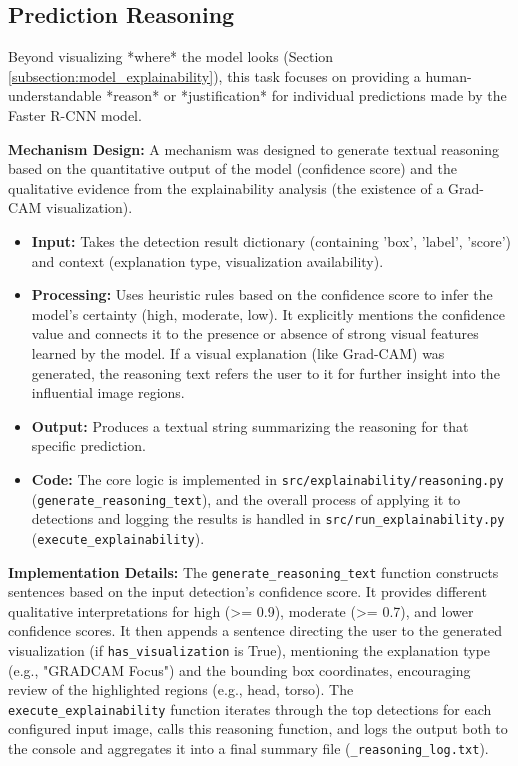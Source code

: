 \subsection{Prediction Reasoning}
\label{subsection:prediction_reasoning}
Beyond visualizing *where* the model looks (Section \ref{subsection:model_explainability}), this task focuses on providing a human-understandable *reason* or *justification* for individual predictions made by the Faster R-CNN model.

\textbf{Mechanism Design:}
A mechanism was designed to generate textual reasoning based on the quantitative output of the model (confidence score) and the qualitative evidence from the explainability analysis (the existence of a Grad-CAM visualization).
\begin{itemize}
    \item   \textbf{Input:} Takes the detection result dictionary (containing 'box', 'label', 'score') and context (explanation type, visualization availability).
    \item   \textbf{Processing:} Uses heuristic rules based on the confidence score to infer the model's certainty (high, moderate, low). It explicitly mentions the confidence value and connects it to the presence or absence of strong visual features learned by the model. If a visual explanation (like Grad-CAM) was generated, the reasoning text refers the user to it for further insight into the influential image regions.
    \item   \textbf{Output:} Produces a textual string summarizing the reasoning for that specific prediction.
    \item   \textbf{Code:} The core logic is implemented in \texttt{src/explainability/reasoning.py} (\texttt{generate\_reasoning\_text}), and the overall process of applying it to detections and logging the results is handled in \texttt{src/run\_explainability.py} (\texttt{execute\_explainability}).
\end{itemize}

\textbf{Implementation Details:}
The \texttt{generate\_reasoning\_text} function constructs sentences based on the input detection's confidence score. It provides different qualitative interpretations for high (>= 0.9), moderate (>= 0.7), and lower confidence scores. It then appends a sentence directing the user to the generated visualization (if \texttt{has\_visualization} is True), mentioning the explanation type (e.g., "GRADCAM Focus") and the bounding box coordinates, encouraging review of the highlighted regions (e.g., head, torso). The \texttt{execute\_explainability} function iterates through the top detections for each configured input image, calls this reasoning function, and logs the output both to the console and aggregates it into a final summary file (\texttt{\_reasoning\_log.txt}).

